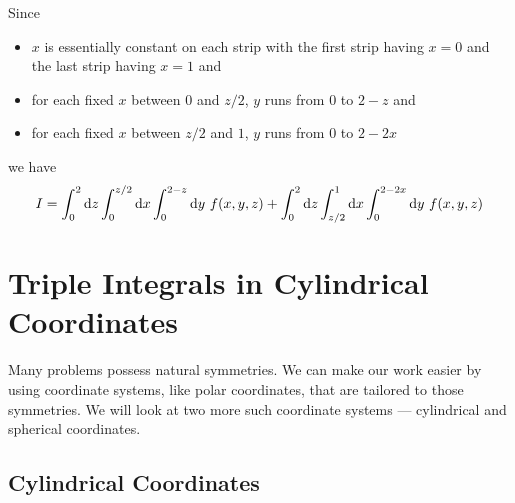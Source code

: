 \begin{eg}
\begin{efig}
\begin{center}
\end{center}
\end{efig}
Since
\begin{itemize} \itemsep1pt \parskip0pt 
\item
$x$ is essentially constant on each strip with the first strip having $x=0$ 
and the last strip having $x=1$ and
\item
for each fixed $x$ between $0$ and $z/2$, $y$ runs from $0$ to $2-z$ and
\item
for each fixed $x$ between $z/2$ and $1$, $y$ runs from $0$ to $2-2x$
\end{itemize}
we have
\begin{equation*}
I=\int_0^2\dee{z}\int_0^{z/2}\dee{x}\int_0^{2-z}\dee{y}\ f(x,y,z)
+\int_0^2\dee{z}\int_{z/2}^{1}\dee{x}\int_0^{2-2x}\dee{y}\ f(x,y,z)
\end{equation*}
\end{eg}

\section{Triple Integrals in Cylindrical Coordinates} \label{sec cylindrical}

Many problems possess natural symmetries. We can make our work easier 
by using coordinate systems, like  polar coordinates, that are 
tailored to those symmetries. We will look at two 
more such coordinate systems --- cylindrical and spherical coordinates.

\subsection{Cylindrical Coordinates} \label{sec cylindrical coords}



